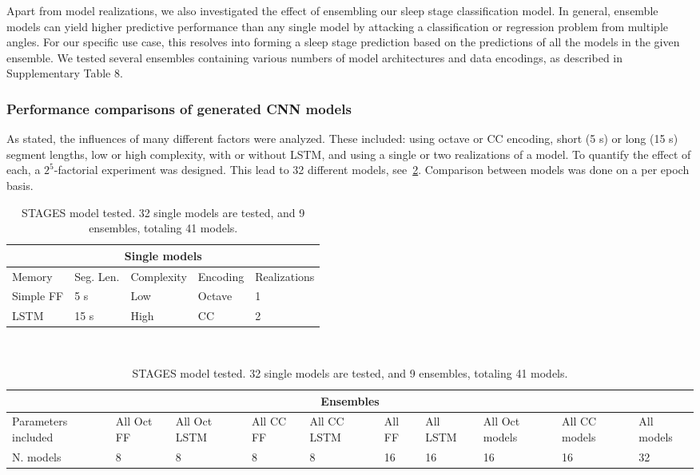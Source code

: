 Apart from model realizations, we also investigated the effect of ensembling our sleep stage classification model. In general, ensemble models can yield higher predictive performance than any single model by attacking a classification or regression problem from multiple angles. For our specific use case, this resolves into forming a sleep stage prediction based on the predictions of all the models in the given ensemble. We tested several ensembles containing various numbers of model architectures and data encodings, as described in Supplementary Table 8. 

\subsubsection{Performance comparisons of generated CNN models}
As stated, the influences of many different factors were analyzed. These included: using octave or CC encoding, short (5 s) or long (15 s) segment lengths, low or high complexity, with or without LSTM, and using a single or two realizations of a model. To quantify the effect of each, a $2^5$-factorial experiment was designed. This lead to 32 different models, see~\cref{tab:paperiii-supptable08}. Comparison between models was done on a per epoch basis. 
\begin{table}[tb]
    \centering
    \small
    \caption[STAGES models]{STAGES model tested. 32 single models are tested, and 9 ensembles, totaling 41 models.}
    \label{tab:paperiii-supptable08}
    \begin{tabular}{@{}lllll@{}}
        \toprule
        \multicolumn{5}{c}{Single models} \\ \midrule
        Memory        & Seg. Len. & Complexity & Encoding & Realizations \\
        Simple FF     & 5 s       & Low        & Octave   & 1            \\
        LSTM          & 15 s      & High       & CC       & 2            \\ \bottomrule
    \end{tabular}
    \\
    \small
    \begin{tabular}{@{}llllllllll@{}}
        \toprule
        \multicolumn{10}{c}{Ensembles} \\ \midrule
        Parameters included & All Oct FF & All Oct LSTM & All CC FF & All CC LSTM & All FF & All LSTM & All Oct models & All CC models & All models \\
        N. models           & 8          & 8            & 8         & 8           & 16     & 16       & 16             & 16            & 32         \\ \bottomrule
    \end{tabular}
\end{table}

